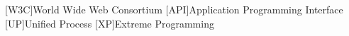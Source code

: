 [W3C]{World Wide Web Consortium}
[API]{Application Programming Interface}
[UP]{Unified Process}
[XP]{Extreme Programming}